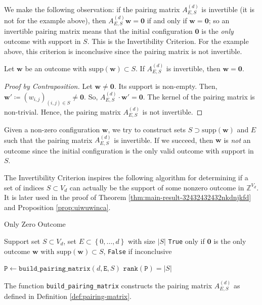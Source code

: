 We make the following observation: if the pairing matrix \( A^{(d)}_{E,S} \) is invertible (it is not for the example above), then \( A^{(d)}_{E,S} \mathbf w = \mathbf 0 \) if and only if \( \mathbf w = \mathbf 0 \); so an invertible pairing matrix means that the initial configuration \( \mathbf{0} \) is the \emph{only} outcome with support in \( S \). This is the Invertibility Criterion. For the example above, this criterion is inconclusive since the pairing matrix is not invertible.

\begin{proposition}
    Let \( \mathbf{w} \) be an outcome with \( \mathrm{supp}(\mathbf w) \subset S \).
    If \( A^{(d)}_{E,S} \) is invertible, then \( \mathbf{w} = \mathbf 0 \).
\end{proposition}

\begin{proof}[Proof by Contraposition]
    Let \( \mathbf{w} \neq \mathbf 0 \). Its support is non-empty. Then, \( \mathbf w' \coloneqq (w_{i,j})_{(i,j) \in S} \neq \mathbf 0 \). So, \( A^{(d)}_{E,S} \cdot \mathbf w' = \mathbf 0 \). The kernel of the pairing matrix is non-trivial. Hence, the pairing matrix \( A^{(d)}_{E,S} \) is not invertible.
\end{proof}

Given a non-zero configuration \( \mathbf{w} \), we try to construct sets \( S \supset \mathrm{supp}(\mathbf w) \) and \( E \) such that the pairing matrix \( A_{E,S}^{(d)} \) is invertible. If we succeed, then \( \mathbf{w} \) is \emph{not} an outcome since the initial configuration is the only valid outcome with support in \( S \). 


The Invertibility Criterion inspires the following algorithm for determining if a set of indices \( S \subset V_d \) can actually be the support of some nonzero outcome in \( \mathbb{Z}^{V_d} \). It is later used in the proof of Theorem \ref{thm:main-result-32432432432nkdnjkfd} and Proposition \ref{prop:uiwuwinca}.


\begin{algorithm}[H]
\caption{Only Zero Outcome}\label{alg:hyperfield_criterion:is_zero}
    \begin{algorithmic}[1]
    \Require Support set $S \subset {V_d}$, set \( E \subset \left\{ 0, \dots, d \right\} \) with size \( \lvert S \vert \)
    \Ensure \texttt{True} only if \( \mathbf{0} \) is the only outcome \( \mathbf{w} \) with \( \mathrm{supp}(\mathbf{w}) \subset S \), \texttt{False} if inconclusive

    \State $\texttt{P} \gets \texttt{build\_pairing\_matrix}(d, \texttt{E}, S)$    
    \State \Return $\texttt{rank}(\texttt{P}) = |S|$
    \end{algorithmic}  
\end{algorithm}
The function \texttt{build\_pairing\_matrix} constructs the pairing matrix \( A^{(d)}_{E,S} \) as defined in Definition \ref{def:pairing-matrix}.


